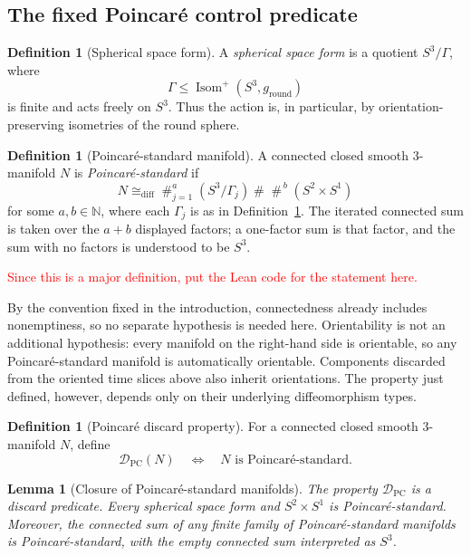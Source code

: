 \documentclass[10pt]{coll-l}
\newcommand{\Isom}{\operatorname{Isom}}
\newcommand{\diffeo}{\mathrel{\cong_{\mathrm{diff}}}}
\newtheorem{lemma}[theorem]{Lemma}
\theoremstyle{definition}
\newtheorem{definition}[theorem]{Definition}
\theoremstyle{remark}
\numberwithin{section}{chapter}
\numberwithin{equation}{chapter}
\begin{document}
\subsection{The fixed Poincar\'e control predicate}

\begin{definition}[Spherical space form]
\label{def:spherical-space-form}
A \emph{spherical space form} is a quotient $S^{3}/\Gamma$, where
\[
  \Gamma\leq\Isom^{+}(S^{3},g_{\mathrm{round}})
\]
is finite and acts freely on $S^{3}$.  Thus the action is, in particular, by
orientation-preserving isometries of the round sphere.
\end{definition}

\begin{definition}[Poincar\'e-standard manifold]
\label{def:poincare-standard}
A connected closed smooth $3$-manifold $N$ is
\emph{Poincar\'e-standard} if
\[
  N\diffeo
  \mathop{\#}_{j=1}^{a}(S^{3}/\Gamma_j)
  \mathbin{\#}
  \mathop{\#}^{\,b}(S^{2}\times S^{1})
\]
for some $a,b\in\mathbb N$, where each $\Gamma_j$ is as in
Definition~\ref{def:spherical-space-form}.  The iterated connected sum is
taken over the $a+b$ displayed factors; a one-factor sum is that factor, and
the sum with no factors is understood to be $S^{3}$.
\end{definition}

\textcolor{red}{Since this is a major definition, put the Lean code for the statement here.}

By the convention fixed in the introduction, connectedness already includes
nonemptiness, so no separate hypothesis is needed here.  Orientability is
not an additional hypothesis: every manifold on the right-hand side is
orientable, so any Poincar\'e-standard manifold is automatically orientable.
Components discarded from the oriented time slices above also inherit
orientations.  The property just defined, however, depends only on their
underlying diffeomorphism types.

\begin{definition}[Poincar\'e discard property]
\label{def:poincare-discard-property}
For a connected closed smooth $3$-manifold $N$, define
\[
  \mathcal D_{\mathrm{PC}}(N)
  \quad\Longleftrightarrow\quad
  N\text{ is Poincar\'e-standard}.
\]
\end{definition}

\begin{lemma}[Closure of Poincar\'e-standard manifolds]
\label{lem:poincare-standard-closure}
The property $\mathcal D_{\mathrm{PC}}$ is a discard predicate.  Every
spherical space form and $S^{2}\times S^{1}$ is Poincar\'e-standard.
Moreover, the connected sum of any finite family of Poincar\'e-standard
manifolds is Poincar\'e-standard, with the empty connected sum interpreted as
$S^{3}$.
\end{lemma}
\end{document}
